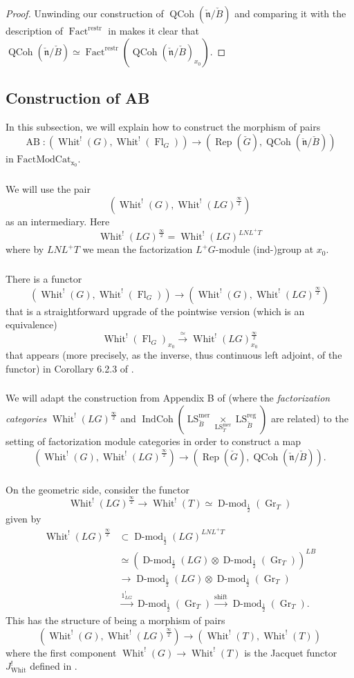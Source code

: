 \documentclass[10pt,a4paper]{amsart}
\newcommand{\on}[1]{\operatorname{#1}}
\newcommand{\Dmodh}{\on{D-mod}_{\frac{1}{2}}}
\newcommand{\IndCoh}{\on{IndCoh}}
\newcommand{\Gcheck}{\check{G}}
\newcommand{\ncheck}{\check{\mathfrak{n}}}
\newcommand{\Bcheck}{\check{B}}
\newcommand{\Tcheck}{\check{T}}
\newcommand{\FactModCat}{\on{FactModCat_{x_0}}}
\newcommand{\sssec}[1]{\subsubsection{}}
\begin{document}
\begin{proof}
    Unwinding our construction of $\on{QCoh}(\ncheck/\Bcheck)$ and comparing it with the description of $\on{Fact}^{\on{restr}}$ in \cite{Katia} makes it clear that $\on{QCoh}(\ncheck/\Bcheck) \simeq \on{Fact}^{\on{restr}}(\on{QCoh}(\ncheck/\Bcheck)_{x_0})$.
\end{proof}

\subsection{Construction of AB} \label{Construction of AB}
In this subsection, we will explain how to construct the morphism of pairs
$$
\on{AB} : ( \on{Whit}^!(G), \on{Whit}^!(\on{Fl}_G)) \longrightarrow (\on{Rep}(\Gcheck), \on{QCoh}(\ncheck/\Bcheck))
$$
in $\FactModCat$.

\sssec{}
We will use the pair
$$
(\on{Whit}^!(G), \on{Whit}^!(LG)^{\frac{\infty}{2}})
$$
as an intermediary. Here
$$
\on{Whit}^!(LG)^{\frac{\infty}{2}} = \on{Whit}^!(LG)^{LNL^+T}
$$
where by $LNL^+T$ we mean the factorization $L^+G$-module (ind-)group at $x_0$.

\sssec{}
There is a functor
$$
(\on{Whit}^!(G), \on{Whit}^!(\on{Fl}_G)) \longrightarrow (\on{Whit}^!(G), \on{Whit}^!(LG)^{\frac{\infty}{2}})
$$
that is a straightforward upgrade of the pointwise version (which is an equivalence)
$$
\on{Whit}^!(\on{Fl}_G)_{x_0} \overset{\simeq}{\longrightarrow} \on{Whit}^!(LG)_{x_0}^{\frac{\infty}{2}}
$$
that appears (more precisely, as the inverse, thus continuous left adjoint, of the functor) in Corollary 6.2.3 of \cite{CPSC2}.

\sssec{}
We will adapt the construction from Appendix B of \cite{GLC3} (where the \emph{factorization categories} $\on{Whit}^!(LG)^{\frac{\infty}{2}}$ and $\IndCoh(\on{LS}_{\Bcheck}^{\on{mer}} \underset{\on{LS}_{\Tcheck}^{\on{mer}}}{\times} \on{LS}_{\Bcheck}^{\on{reg}})$ are related) to the setting of factorization module categories in order to construct a map
$$
(\on{Whit}^!(G), \on{Whit}^!(LG)^{\frac{\infty}{2}}) \longrightarrow (\on{Rep}(\Gcheck), \on{QCoh}(\ncheck/\Bcheck)).
$$

\sssec{}
On the geometric side, consider the functor
$$
\on{Whit}^!(LG)^{\frac{\infty}{2}} \longrightarrow \on{Whit}^!(T) \simeq \Dmodh(\on{Gr}_T)
$$
given by
\begin{align}
    \on{Whit}^!(LG)^{\frac{\infty}{2}} &\subset \Dmodh(LG)^{LNL^+T} \\
    &\simeq (\Dmodh(LG) \otimes \Dmodh(\on{Gr}_T))^{LB} \\
    &\to \Dmodh(LG) \otimes \Dmodh(\on{Gr}_T) \\
    &\overset{1_{LG}^!}{\to} \Dmodh(\on{Gr}_T) \overset{\on{shift}}{\to} \Dmodh(\on{Gr}_T).
\end{align}
This has the structure of being a morphism of pairs
$$
(\on{Whit}^!(G), \on{Whit}^!(LG)^{\frac{\infty}{2}}) \longrightarrow (\on{Whit}^!(T), \on{Whit}^!(T))
$$
where the first component $\on{Whit}^!(G) \to \on{Whit}^!(T)$ is the Jacquet functor $J_{\on{Whit}}^!$ defined in \cite{GLC3}.
\end{document}
